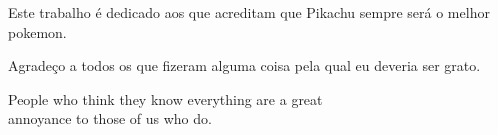 \documentclass[times,english,brazilian,oneside,section=TITLE]{ifes8}
\begin{document}







  


\begin{dedicatoria}
  \vspace*{\fill}
  \hspace{0.2\textwidth}
  \begin{minipage}{0.8\textwidth}
    Este trabalho é dedicado aos que acreditam que Pikachu sempre será o
    melhor pokemon.
  \end{minipage}
\end{dedicatoria}


\begin{agradecimentos}
  Agradeço a todos os que fizeram alguma coisa pela qual eu deveria
  ser grato.
\end{agradecimentos}


\begin{epigrafe}
  \vspace*{\fill}
  \begin{otherlanguage}{english}
    \begin{flushright}
      \begin{SingleSpace}
        People who think they know everything are a great \\
        annoyance to those of us who do. \cite{Asimov2004}
      \end{SingleSpace}
    \end{flushright}
  \end{otherlanguage}
\end{epigrafe}
\end{document}
